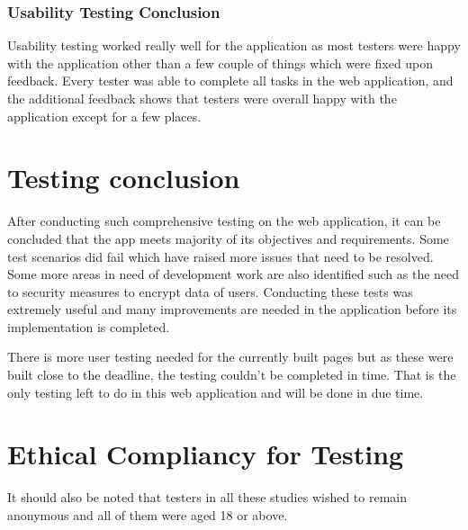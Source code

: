 \subsubsection{Usability Testing Conclusion}
Usability testing worked really well for the application as most testers were happy with the application other than a few couple of things which were fixed upon feedback. Every tester was able to complete all tasks in the web application, and the additional feedback shows that testers were overall happy with the application except for a few places. 

\section{Testing conclusion}
After conducting such comprehensive testing on the web application, it can be concluded that the app meets majority of its objectives and requirements. Some test scenarios did fail which have raised more issues that need to be resolved. Some more areas in need of development work are also identified such as the need to security measures to encrypt data of users. Conducting these tests was extremely useful and many improvements are needed in the application before its implementation is completed. 

There is more user testing needed for the currently built pages but as these were built close to the deadline, the testing couldn't be completed in time. That is the only testing left to do in this web application and will be done in due time.

\section{Ethical Compliancy for Testing} 
It should also be noted that testers in all these studies wished to remain anonymous and all of them were aged 18 or above.